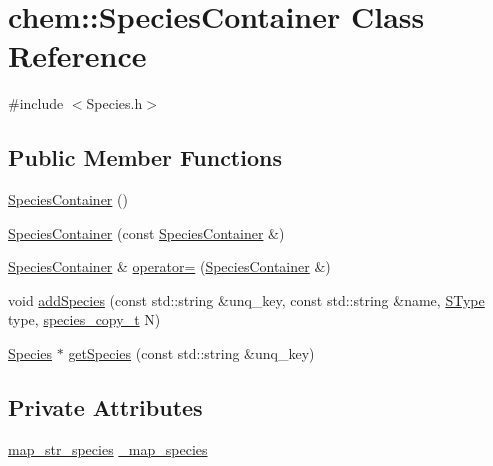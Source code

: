 \hypertarget{classchem_1_1SpeciesContainer}{\section{chem\-:\-:Species\-Container Class Reference}
\label{classchem_1_1SpeciesContainer}
}


{\ttfamily \#include $<$Species.\-h$>$}

\subsection*{Public Member Functions}
\begin{DoxyCompactItemize}
\item 
\hyperlink{classchem_1_1SpeciesContainer_aea14cacda9bca611aa0f84ab407136aa}{Species\-Container} ()
\item 
\hyperlink{classchem_1_1SpeciesContainer_aa0e49f8b66abe2d99e7473c5f0869ee7}{Species\-Container} (const \hyperlink{classchem_1_1SpeciesContainer}{Species\-Container} \&)
\item 
\hyperlink{classchem_1_1SpeciesContainer}{Species\-Container} \& \hyperlink{classchem_1_1SpeciesContainer_a8cd98d4a7ad5c2c7a70e5288956d7527}{operator=} (\hyperlink{classchem_1_1SpeciesContainer}{Species\-Container} \&)
\item 
void \hyperlink{classchem_1_1SpeciesContainer_afedac45169c28501aaea74bde42b059f}{add\-Species} (const std\-::string \&unq\-\_\-key, const std\-::string \&name, \hyperlink{namespacechem_ad1edc1332f82ed64dd8a810596e781da}{S\-Type} type, \hyperlink{common_8h_a3503f321fd36304ee274141275cca586}{species\-\_\-copy\-\_\-t} N)
\item 
\hyperlink{classchem_1_1Species}{Species} $\ast$ \hyperlink{classchem_1_1SpeciesContainer_a51f5daaad50b1f48b4793fe9a5cedfe0}{get\-Species} (const std\-::string \&unq\-\_\-key)
\end{DoxyCompactItemize}
\subsection*{Private Attributes}
\begin{DoxyCompactItemize}
\item 
\hyperlink{namespacechem_aac36ae5d4f187a207862683264523dce}{map\-\_\-str\-\_\-species} \hyperlink{classchem_1_1SpeciesContainer_ac4a179e16447219d06b9f7fe5b657156}{\-\_\-map\-\_\-species}
\end{DoxyCompactItemize}


